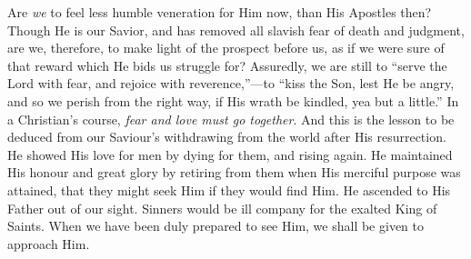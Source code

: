 Are \emph{we} to feel less humble veneration for Him
now, than His Apostles then? Though He is our Savior, and
has removed all slavish fear of death and judgment, are
we, therefore, to make light of the prospect before us,
as if we were sure of that reward which He bids us
struggle for? Assuredly, we are still to ``serve the
Lord with fear, and rejoice with reverence,''—to
``kiss the Son, lest He be angry, and so we perish
from the right way, if His wrath be kindled, yea but a
little.'' In a Christian's course, \emph{fear and love
must go together}. And this is the lesson to be
deduced from our Saviour's withdrawing from the world
after His resurrection. He showed His love for men by
dying for them, and rising again. He maintained His
honour and great glory by retiring from them when His
merciful purpose was attained, that they might seek Him
if they would find Him. He ascended to His Father out of
our sight. Sinners would be ill company for the exalted
King of Saints. When we have been duly prepared to see
Him, we shall be given to approach Him.

